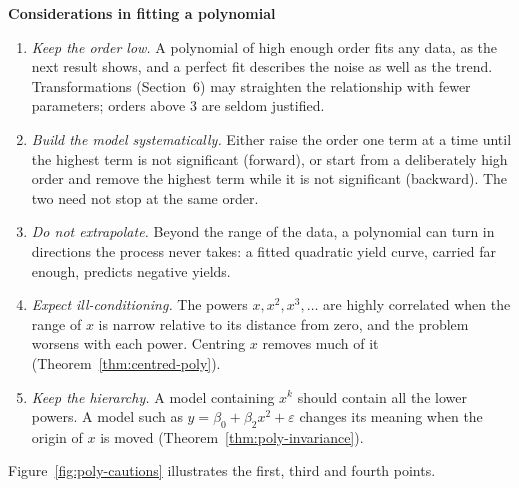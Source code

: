 \documentclass[11pt,a4paper]{article}
\numberwithin{equation}{section}
\theoremstyle{definition}
\newcommand{\subhead}[1]{%
  \par\medskip\noindent\textbf{#1}\par\nobreak\smallskip}
\begin{document}
\subhead{Considerations in fitting a polynomial}
\begin{enumerate}[label=(\arabic*)]
\item \emph{Keep the order low.} A polynomial of high enough order fits any data, as the next result shows,
and a perfect fit describes the noise as well as the trend. Transformations (Section~6) may straighten
the relationship with fewer parameters; orders above $3$ are seldom justified.
\item \emph{Build the model systematically.} Either raise the order one term at a time until the highest term is
not significant (forward), or start from a deliberately high order and remove the highest term while it is
not significant (backward). The two need not stop at the same order.
\item \emph{Do not extrapolate.} Beyond the range of the data, a polynomial can turn in directions the process
never takes: a fitted quadratic yield curve, carried far enough, predicts negative yields.
\item \emph{Expect ill-conditioning.} The powers $x, x^2, x^3, \dots$ are highly correlated when the range of $x$ is
narrow relative to its distance from zero, and the problem worsens with each power. Centring $x$ removes
much of it (Theorem~\ref{thm:centred-poly}).
\item \emph{Keep the hierarchy.} A model containing $x^k$ should contain all the lower powers. A model such as
$y = \beta_0 + \beta_2x^2 + \varepsilon$ changes its meaning when the origin of $x$ is moved
(Theorem~\ref{thm:poly-invariance}).
\end{enumerate}
Figure~\ref{fig:poly-cautions} illustrates the first, third and fourth points.
\end{document}
